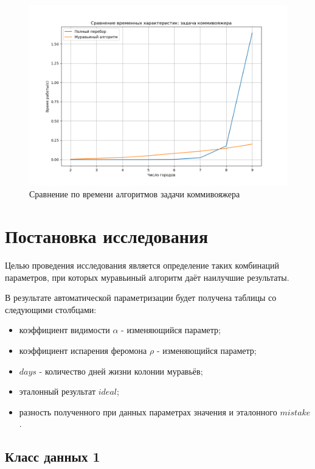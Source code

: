 \begin{figure}[H]
	\begin{center}
		\includegraphics[scale=0.5]{img/time.png}
	\end{center}
	\captionsetup{justification=centering}
	\caption{Сравнение по времени алгоритмов задачи коммивояжера}
	\label{img:times}
\end{figure}

\section{Постановка исследования}

Целью проведения исследования является определение таких комбинаций параметров, при которых муравьиный алгоритм даёт наилучшие результаты.

В результате автоматической параметризации будет получена таблицы со следующими столбцами:
\begin{itemize}
	\item коэффициент видимости $\alpha$ - изменяющийся параметр;
	\item коэффициент испарения феромона $\rho$ - изменяющийся параметр;
	\item $days$ - количество дней жизни колонии муравьёв;
	\item эталонный результат $ideal$;
	\item разность полученного при данных параметрах значения и эталонного $mistake$.
\end{itemize}

\subsection{Класс данных 1}

